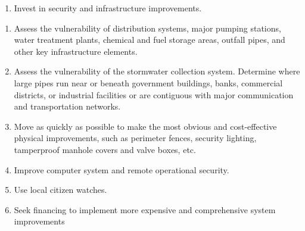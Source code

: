\documentclass{article}
\begin{document}
\begin{enumerate}
\item
  Invest in security and infrastructure improvements.
\end{enumerate}

\begin{enumerate}
\item
  Assess the vulnerability of distribution systems, major pumping
  stations, water treatment plants, chemical and fuel storage areas,
  outfall pipes, and other key infrastructure elements.
\item
  Assess the vulnerability of the stormwater collection system.
  Determine where large pipes run near or beneath government buildings,
  banks, commercial districts, or industrial facilities or are
  contiguous with major communication and transportation networks.
\item
  Move as quickly as possible to make the most obvious and
  cost-effective physical improvements, such as perimeter fences,
  security lighting, tamperproof manhole covers and valve boxes, etc.
\item
  Improve computer system and remote operational security.
\item
  Use local citizen watches.
\item
  Seek financing to implement more expensive and comprehensive system
  improvements
\end{enumerate}
\end{document}
